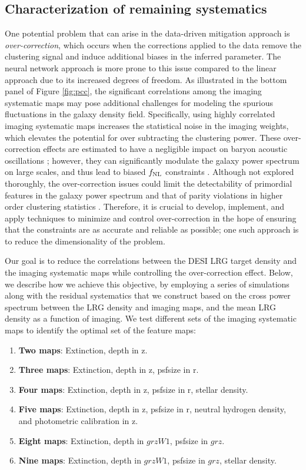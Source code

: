 \subsection{Characterization of remaining systematics}
\label{ssec:characterization}
One potential problem that can arise in the data-driven mitigation approach is \textit{over-correction}, which occurs when the corrections applied to the data remove the clustering signal and induce additional biases in the inferred parameter. The neural network approach is more prone to this issue compared to the linear approach due to its increased degrees of freedom. As illustrated in the bottom panel of Figure \ref{fig:pcc}, the significant correlations among the imaging systematic maps may pose additional challenges for modeling the spurious fluctuations in the galaxy density field. Specifically, using highly correlated imaging systematic maps increases the statistical noise in the imaging weights, which elevates the potential for over subtracting the clustering power. These over-correction effects are estimated to have a negligible impact on baryon acoustic oscillations \citep{merz2021clustering}; however, they can significantly modulate the galaxy power spectrum on large scales, and thus lead to biased $f_{\rm NL}$ constraints \citep{rezaie2021primordial, mueller2022primordial}. Although not explored thoroughly, the over-correction issues could limit the detectability of primordial features in the galaxy power spectrum and that of parity violations in higher order clustering statistics \citep{beutler2019primordial, cahn2021test, philcox2022probing}. Therefore, it is crucial to develop, implement, and apply techniques to minimize and control over-correction in the hope of ensuring that the constraints are as accurate and reliable as possible; one such approach is to reduce the dimensionality of the problem. 

Our goal is to reduce the correlations between the DESI LRG target density and the imaging systematic maps while controlling the over-correction effect. Below, we describe how we achieve this objective, by employing a series of simulations along with the residual systematics that we construct based on the cross power spectrum between the LRG density and imaging maps, and the mean LRG density as a function of imaging. We test different sets of the imaging systematic maps to identify the optimal set of the feature maps:
\begin{enumerate}[itemindent=*]
\item \textbf{Two maps}: Extinction, depth in z.
\item \textbf{Three maps}: Extinction, depth in z, psfsize in r.
\item \textbf{Four maps}: Extinction, depth in z, psfsize in r, stellar density.
\item \textbf{Five maps}: Extinction, depth in z, psfsize in r, neutral hydrogen density, and photometric calibration in z.
\item \textbf{Eight maps}: Extinction, depth in $grzW1$, psfsize in $grz$.
\item \textbf{Nine maps}: Extinction, depth in $grzW1$, psfsize in $grz$, stellar density.
\end{enumerate}

